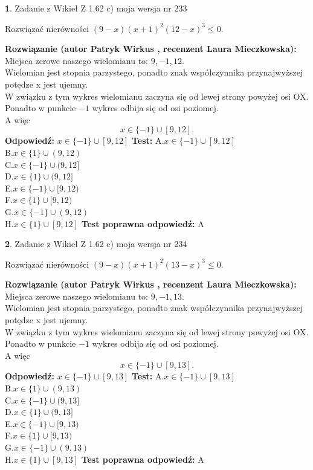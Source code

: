 \documentclass[12pt, a4paper]{article}
\theoremstyle{definition} %
\newtheorem{zad}{}
\newcommand{\zadStart}[1]{\begin{zad}#1\newline}
\newcommand{\zadStop}{\end{zad}}
\newcommand{\rozwStart}[2]{\noindent \textbf{Rozwiązanie (autor #1 , recenzent #2): }\newline}
\newcommand{\rozwStop}{\newline}
\newcommand{\odpStart}{\noindent \textbf{Odpowiedź:}\newline}
\newcommand{\odpStop}{\newline}
\newcommand{\testStart}{\noindent \textbf{Test:}\newline}
\newcommand{\testStop}{\newline}
\newcommand{\kluczStart}{\noindent \textbf{Test poprawna odpowiedź:}\newline}
\newcommand{\kluczStop}{\newline}
\begin{document}
\zadStart{Zadanie z Wikieł Z 1.62 c) moja wersja nr 233}

Rozwiązać nierówności $(9-x)(x+1)^{2}(12-x)^{3}\le0$.
\zadStop
\rozwStart{Patryk Wirkus}{Laura Mieczkowska}
Miejsca zerowe naszego wielomianu to: $9, -1, 12$.\\
Wielomian jest stopnia parzystego, ponadto znak współczynnika przy\linebreak najwyższej potędze x jest ujemny.\\ W związku z tym wykres wielomianu zaczyna się od lewej strony powyżej osi OX.\\
Ponadto w punkcie $-1$ wykres odbija się od osi poziomej.\\
A więc $$x \in \{-1\} \cup [9,12].$$
\rozwStop
\odpStart
$x \in \{-1\} \cup [9,12]$
\odpStop
\testStart
A.$x \in \{-1\} \cup [9,12]$\\
B.$x \in \{1\} \cup (9,12)$\\
C.$x \in \{-1\} \cup (9,12]$\\
D.$x \in \{1\} \cup (9,12]$\\
E.$x \in \{-1\} \cup [9,12)$\\
F.$x \in \{1\} \cup [9,12)$\\
G.$x \in \{-1\} \cup (9,12)$\\
H.$x \in \{1\} \cup [9,12]$
\testStop
\kluczStart
A
\kluczStop



\zadStart{Zadanie z Wikieł Z 1.62 c) moja wersja nr 234}

Rozwiązać nierówności $(9-x)(x+1)^{2}(13-x)^{3}\le0$.
\zadStop
\rozwStart{Patryk Wirkus}{Laura Mieczkowska}
Miejsca zerowe naszego wielomianu to: $9, -1, 13$.\\
Wielomian jest stopnia parzystego, ponadto znak współczynnika przy\linebreak najwyższej potędze x jest ujemny.\\ W związku z tym wykres wielomianu zaczyna się od lewej strony powyżej osi OX.\\
Ponadto w punkcie $-1$ wykres odbija się od osi poziomej.\\
A więc $$x \in \{-1\} \cup [9,13].$$
\rozwStop
\odpStart
$x \in \{-1\} \cup [9,13]$
\odpStop
\testStart
A.$x \in \{-1\} \cup [9,13]$\\
B.$x \in \{1\} \cup (9,13)$\\
C.$x \in \{-1\} \cup (9,13]$\\
D.$x \in \{1\} \cup (9,13]$\\
E.$x \in \{-1\} \cup [9,13)$\\
F.$x \in \{1\} \cup [9,13)$\\
G.$x \in \{-1\} \cup (9,13)$\\
H.$x \in \{1\} \cup [9,13]$
\testStop
\kluczStart
A
\kluczStop
\end{document}
